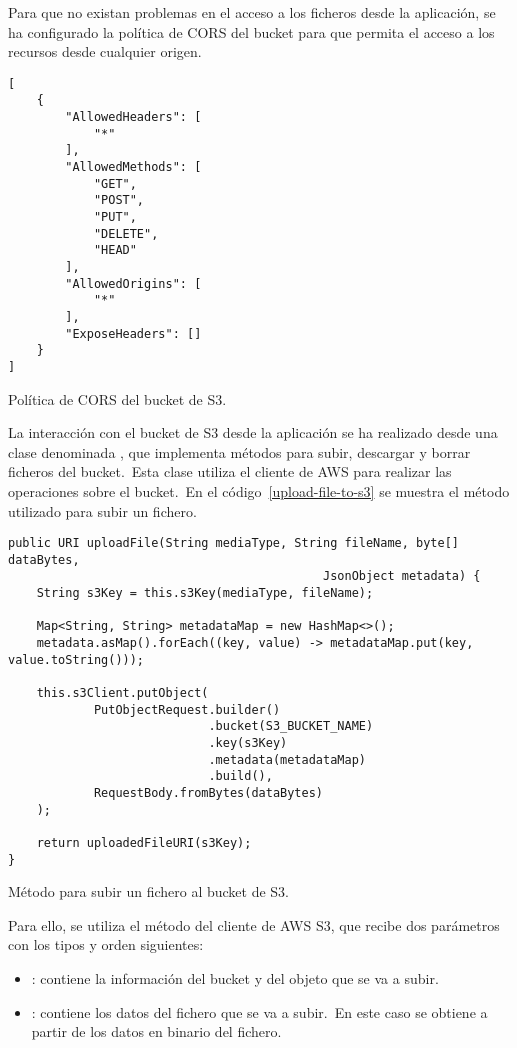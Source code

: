 Para que no existan problemas en el acceso a los ficheros desde la aplicación, se ha configurado la política de CORS
del bucket para que permita el acceso a los recursos desde cualquier origen.

\begin{codeBlock}
	\begin{verbatim}
[
	{
		"AllowedHeaders": [
			"*"
		],
		"AllowedMethods": [
			"GET",
			"POST",
			"PUT",
			"DELETE",
			"HEAD"
		],
		"AllowedOrigins": [
			"*"
		],
		"ExposeHeaders": []
	}
]
	\end{verbatim}
	\caption{Política de CORS del bucket de S3.}
\end{codeBlock}

La interacción con el bucket de S3 desde la aplicación se ha realizado desde una clase denominada , que
implementa métodos para subir, descargar y borrar ficheros del bucket.\ Esta clase utiliza el cliente de AWS
para realizar las operaciones sobre el bucket.\ En el código~\ref{upload-file-to-s3} se muestra el método utilizado
para subir un fichero.

\begin{codeBlock}
	\begin{verbatim}
public URI uploadFile(String mediaType, String fileName, byte[] dataBytes,
											JsonObject metadata) {
	String s3Key = this.s3Key(mediaType, fileName);

	Map<String, String> metadataMap = new HashMap<>();
	metadata.asMap().forEach((key, value) -> metadataMap.put(key, value.toString()));

	this.s3Client.putObject(
			PutObjectRequest.builder()
			                .bucket(S3_BUCKET_NAME)
			                .key(s3Key)
			                .metadata(metadataMap)
			                .build(),
			RequestBody.fromBytes(dataBytes)
	);

	return uploadedFileURI(s3Key);
}
	\end{verbatim}
	\caption{Método para subir un fichero al bucket de S3.}
	\label{upload-file-to-s3}
\end{codeBlock}

Para ello, se utiliza el método  del cliente de AWS S3, que recibe dos parámetros con los tipos y
orden siguientes:

\begin{itemize}
	\item {}: contiene la información del bucket y del objeto que se va a subir.
	\item {}: contiene los datos del fichero que se va a subir.\ En este caso se obtiene
	a partir de los datos en binario del fichero.
\end{itemize}
